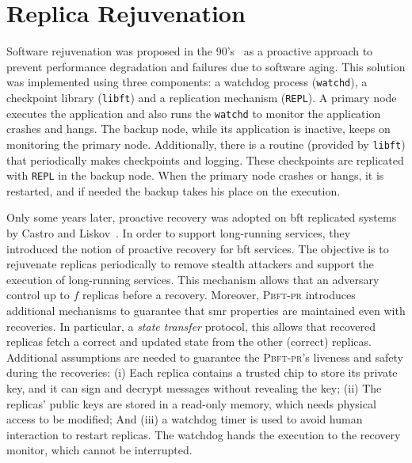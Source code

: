 

\section{Replica Rejuvenation}
Software rejuvenation was proposed in the 90's~\cite{Huang:1993,Huang:1995} as a proactive approach to prevent performance degradation and failures due to software aging. 
This solution was implemented using three components: a watchdog process (\texttt{watchd}), a checkpoint library (\texttt{libft}) and a replication mechanism (\texttt{REPL}). 
A primary node executes the application and also runs the \texttt{watchd} to monitor the application crashes and hangs. 
The backup node, while its application is inactive, keeps on monitoring the primary node. 
Additionally, there is a routine (provided by \texttt{libft}) that periodically makes checkpoints and logging. 
These checkpoints are replicated with \texttt{REPL} in the backup node. 
When the primary node crashes or hangs, it is restarted, and if needed the backup takes his place on the execution.



Only some years later, proactive recovery was adopted on \gls{bft} replicated systems by Castro and Liskov~\cite{Castro:2002}.
In order to support long-running services, they introduced the notion of proactive recovery for \gls{bft} services. 
The objective is to rejuvenate replicas periodically to remove stealth attackers and support the execution of long-running services. 
This mechanism allows that an adversary control up to $f$ replicas before a recovery.
Moreover, \textsc{Pbft-pr} introduces additional mechanisms to guarantee that \gls{smr} properties are maintained even with recoveries.
In particular, a \emph{state transfer} protocol, this allows that recovered replicas fetch a correct and updated state from the other (correct) replicas.
Additional assumptions are needed to guarantee the \textsc{Pbft-pr}'s liveness and safety during the recoveries: 
(i) Each replica contains a trusted chip to store its private key, and it can sign and decrypt messages without revealing the key; 
(ii) The replicas' public keys are stored in a read-only memory, which needs physical access to be modified; 
And (iii) a watchdog timer is used to avoid human interaction to restart replicas. 
The watchdog hands the execution to the recovery monitor, which cannot be interrupted.


